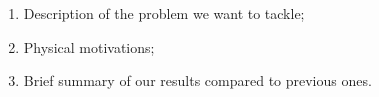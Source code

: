 \begin{enumerate}
    \item Description of the problem we want to tackle;
    \item Physical motivations;
    \item Brief summary of our results compared to previous ones.
\end{enumerate}